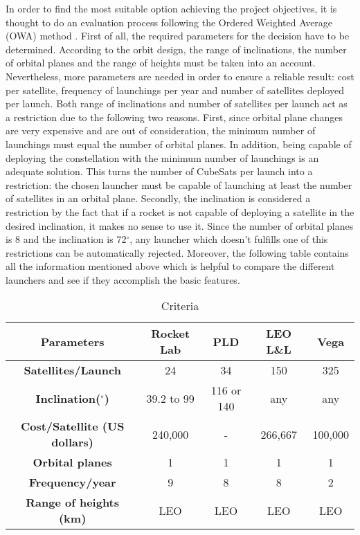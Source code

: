 In order to find the most suitable option achieving the project objectives, it is thought to do an evaluation process following the Ordered Weighted Average (OWA) method . First of all, the required parameters for the decision have to be determined. According to the orbit design, the range of inclinations, the number of orbital planes and the range of heights must be taken into an account. Nevertheless, more parameters are needed in order to ensure a reliable result: cost per satellite, frequency of launchings per year and number of satellites deployed per launch. Both range of inclinations and number of satellites per launch act as a restriction due to the following two reasons. First, since orbital plane changes are very expensive and are out of consideration, the minimum number of launchings must equal the number of orbital planes. In addition, being capable of deploying the constellation with the minimum number of launchings is an adequate solution. This turns the number of CubeSats per launch into a restriction: the chosen launcher must be capable of launching at least the number of satellites in an orbital plane. Secondly, the inclination is considered a restriction by the fact that if a rocket is not capable of deploying a satellite in the desired inclination, it makes no sense to use it. 
Since the number of orbital planes is 8 and the inclination is 72$^{\circ}$, any launcher which doesn't fulfills one of this restrictions can be automatically rejected. 
\newline\newline
 Moreover, the following table contains all the information mentioned above which is helpful to compare the different launchers and see if they accomplish the basic features. 
 \newline\newline
	\begin{table}[h]
	\begin{center}
	\begin{tabular}{|c|c|c|c|c|}
	\hline
	 \bf{Parameters} & \bf{Rocket Lab} & \bf{PLD} & \bf{LEO L\&L} & \bf{Vega}\\
	\hline 
	\bf{Satellites/Launch} & 24 & 34 & 150 & 325 \\
	\hline 
	\bf{Inclination($^{\circ}$) } & {39.2 to 99} & {116 or 140} & {any} & {any}\\
	\hline 
	 \bf{Cost/Satellite (US dollars)} & 240,000 & - & 266,667 & 100,000\\
	\hline 
	\bf{Orbital planes} & 1 & 1 & 1 & 1 \\
	\hline 
	\bf{Frequency/year} & 9 & 8 & 8 & 2 \\
	\hline 
	\bf{Range of heights (km)} & LEO & LEO & LEO & LEO\\
	\hline
	\end{tabular}
	\end{center}
	\caption{Criteria}
	\end{table} 

